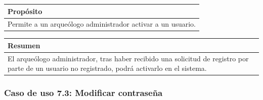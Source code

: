     \begin{table}[H]
        \centering
        \begin{tabularx}{\textwidth}{@{} |L |@{}} \hline
            \textbf{Propósito} \\
            \hline
            Permite a un arqueólogo administrador activar a un usuario. \\
            \hline
        \end{tabularx}
    \end{table}

    \begin{table}[H]
        \centering
        \begin{tabularx}{\textwidth}{@{} |L |@{}} \hline
            \textbf{Resumen} \\
            \hline
            El arqueólogo administrador, tras haber recibido una solicitud de registro por parte
            de un usuario no registrado, podrá activarlo en el sistema. \\
            \hline
        \end{tabularx}
    \end{table}

\subsubsection{Caso de uso 7.3: Modificar contraseña}

